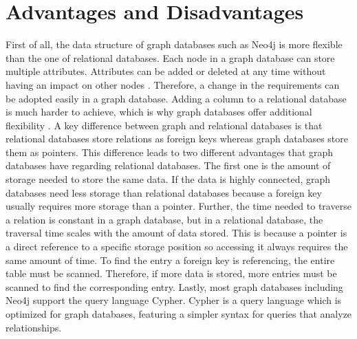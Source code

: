 \section{Advantages and Disadvantages} \label{sec:advantagesDisadvantagesNeo4j}

First of all, the data structure of graph databases such as Neo4j is more flexible than the one of relational databases. Each node in a graph database can store multiple attributes. Attributes can be added or deleted at any time without having an impact on other nodes \parencite{adv_and_disadv_neo4j}. Therefore, a change in the requirements can be adopted easily in a graph database. Adding a column to a relational database is much harder to achieve, which is why graph databases offer additional flexibility \parencite{diff_rela_neo4j}.
A key difference between graph and relational databases is that relational databases store relations as foreign keys whereas graph databases store them as pointers. This difference leads to two different advantages that graph databases have regarding relational databases. The first one is the amount of storage needed to store the same data. If the data is highly connected, graph databases need less storage than relational databases because a foreign key usually requires more storage than a pointer. Further, the time needed to traverse a relation is constant in a graph database, but in a relational database, the traversal time scales with the amount of data stored. This is because a pointer is a direct reference to a specific storage position so accessing it always requires the same amount of time. To find the entry a foreign key is referencing, the entire table must be scanned. Therefore, if more data is stored, more entries must be scanned to find the corresponding entry. \parencite{diff_rela_neo4j}
Lastly, most graph databases including Neo4j support the query language Cypher. Cypher is a query language which is optimized for graph databases, featuring a simpler syntax for queries that analyze relationships. \parencite{use_cases_neo4j}

